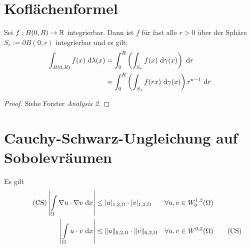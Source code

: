 \section{Koflächenformel}
\begin{satz}
	Sei $f:B(0,R)\rightarrow \mathbb{R}$ integrierbar. 
	Dann ist $f$ für fast alle $r>0$ über der Sphäre $S_r := \partial B(0,r)$ integrierbar und es gilt:
	\begin{align*}
		\int_{B(0,R)}f(x) \text{ d}\lambda(x) &= \int_0^R \left(\int_{S_r} f(x) \text{ d}\gamma(x)\right) \text{ d} r \\
																	 &= \int_0^R \left(\int_{S_1} f(rx) \text{ d}\gamma(x)\right)r^{n-1} \text{ d} r
	\end{align*}
\end{satz}

\begin{proof}
	Siehe Forster \textit{Analysis 2}.
\end{proof}

\section{Cauchy-Schwarz-Ungleichung auf Sobolevräumen}
Es gilt
\begin{align}\label{eqCS}\tag{CS}
	\left|\int\limits_\Omega\nabla u\cdot\nabla v\text{ d} x\right|
	&\leq\vert u\vert_{1,2,\Omega}\cdot\vert v\vert_{1,2,\Omega}
	&\forall& u,v\in W_0^{1,2}(\Omega)\\
	\left|\int\limits_\Omega u\cdot v\text{ d} x\right|&\leq\Vert u\Vert_{0,2,\Omega}\cdot\Vert v\Vert_{0,2,\Omega}
	&\forall& u,v\in W^{0,2}(\Omega)\label{eqCSW02}\tag{CS}
\end{align}

